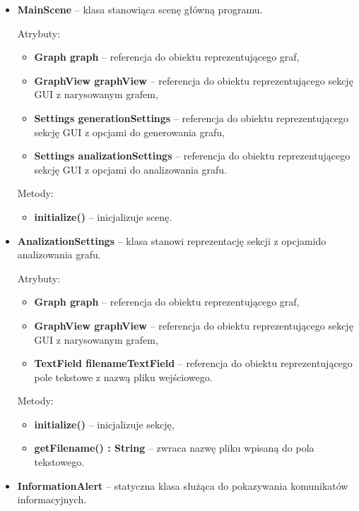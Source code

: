 \documentclass{article}
\begin{document}
\begin{itemize}
\newpage
    
    \item \textbf{MainScene} -- klasa stanowiąca scenę główną programu.
    
    Atrybuty:
    \begin{itemize}
        \item \textbf{Graph graph} -- referencja do obiektu reprezentującego graf,
        \item \textbf{GraphView graphView} -- referencja do obiektu reprezentującego sekcję GUI z narysowanym grafem,
        \item \textbf{Settings generationSettings} -- referencja do obiektu reprezentującego sekcję GUI z opcjami do generowania grafu,
        \item \textbf{Settings analizationSettings} -- referencja do obiektu reprezentującego sekcję GUI z opcjami do analizowania grafu.
    \end{itemize}
    
    Metody:
    \begin{itemize}
        \item \textbf{initialize()} -- inicjalizuje scenę.
    \end{itemize}
    
    \item \textbf{AnalizationSettings} -- klasa stanowi reprezentację sekcji z opcjami\linebreak do analizowania grafu.
    
    Atrybuty:
    \begin{itemize}
        \item \textbf{Graph graph} -- referencja do obiektu reprezentującego graf,
        \item \textbf{GraphView graphView} -- referencja do obiektu reprezentującego sekcję GUI z narysowanym grafem,
        \item \textbf{TextField filenameTextField} -- referencja do obiektu reprezentującego pole tekstowe z nazwą pliku wejściowego.
    \end{itemize}
    
    Metody:
    \begin{itemize}
        \item \textbf{initialize()} -- inicjalizuje sekcję,
        \item \textbf{getFilename() : String} -- zwraca nazwę pliku wpisaną do pola tekstowego.
    \end{itemize}
    
    \item \textbf{InformationAlert} -- statyczna klasa służąca do pokazywania komunikatów informacyjnych.
    

\end{itemize}
\end{document}
